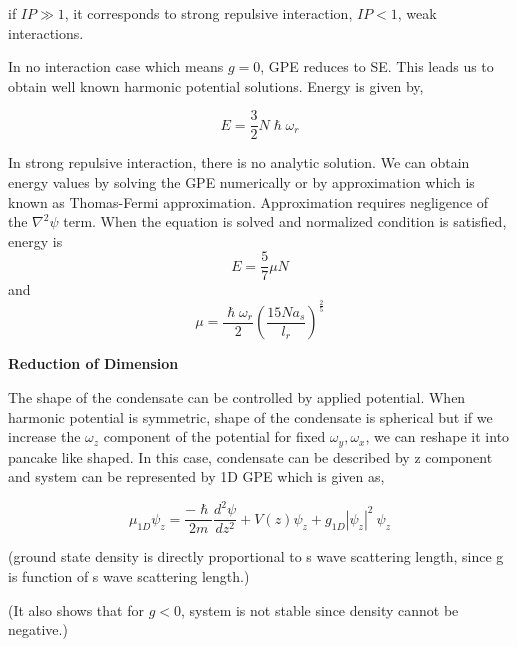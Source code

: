 \documentclass[%
 reprint,
 amsmath,amssymb,
 aps,
]{revtex4-1}
\begin{document}
if $ IP \gg 1 $, it corresponds to strong repulsive interaction, $ IP < 1 $, weak interactions.  

In no interaction case which means $g = 0$, GPE reduces to SE. This leads us to
obtain well known harmonic potential solutions. Energy is given by,

$$ E = \frac{3}{2}N \hslash \omega_r$$

In strong repulsive interaction, there is no analytic solution. We can obtain 
energy values by solving the GPE numerically or by approximation which is known as Thomas-Fermi approximation. Approximation requires negligence of the 
$\nabla^2\psi$ term. When the equation is solved and normalized condition is satisfied, energy is $$ E = \frac{5}{7} \mu N $$ and $$ \mu = \frac{\hslash \omega_r}{2} (\frac{15Na_s}{l_r})^\frac{2}{5} $$

\textbf{Reduction of Dimension}

The shape of the condensate can be controlled by applied potential. When harmonic potential is symmetric, shape of the condensate is spherical but if we
increase the $\omega_z$ component of the potential for fixed $\omega_y, \omega_x$, we can reshape it into pancake like shaped. In this case, condensate can be described by z component and system can be represented by 1D GPE which is given as,

$$ \mu_{1D}\psi_z = \frac {-\hslash}{2m} \frac{d^2\psi}{dz^2}
+ V(z)\psi_z + g_{1D}|\psi_z|^2\ \psi_z $$



(ground state density is directly proportional to s wave scattering length,
since g is function of s wave scattering length.)

(It also shows that for $g < 0$, system is not stable since density cannot be negative.)
\end{document}
